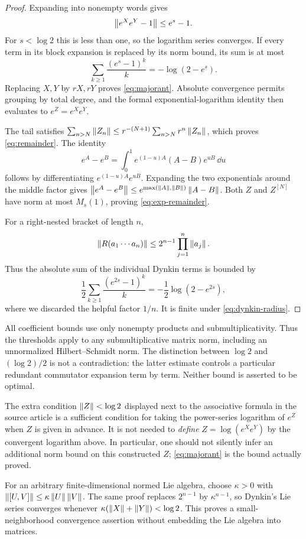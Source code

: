\begin{proof}
Expanding into nonempty words gives
\[
 \left\lVert e^Xe^Y-1\right\rVert\leq e^s-1.
\]
For $s<\log2$ this is less than one, so the logarithm series converges. If every term in its block expansion is replaced by its norm bound, its sum is at most
\[
 \sum_{k\geq1}\frac{(e^s-1)^k}{k}=-\log(2-e^s).
\]
Replacing $X,Y$ by $rX,rY$ proves \cref{eq:majorant}. Absolute convergence permits grouping by total degree, and the formal exponential-logarithm identity then evaluates to $e^Z=e^Xe^Y$.

The tail satisfies
$\sum_{n>N}\left\lVert Z_n\right\rVert\leq r^{-(N+1)}\sum_{n>N}r^n\left\lVert Z_n\right\rVert$,
which proves \cref{eq:remainder}. The identity
\[
 e^A-e^B=\int_0^1e^{(1-u)A}(A-B)e^{uB}\,\dd u
\]
follows by differentiating $e^{(1-u)A}e^{uB}$. Expanding the two exponentials around the middle factor gives
$\left\lVert e^A-e^B\right\rVert\leq e^{\max(\left\lVert A\right\rVert,\left\lVert B\right\rVert)}\left\lVert A-B\right\rVert$.
Both $Z$ and $Z^{[N]}$ have norm at most $M_s(1)$, proving \cref{eq:exp-remainder}.

For a right-nested bracket of length $n$,
\[
 \left\lVert R(a_1\cdots a_n)\right\rVert\leq2^{n-1}\prod_{j=1}^n\left\lVert a_j\right\rVert.
\]
Thus the absolute sum of the individual Dynkin terms is bounded by
\[
 \frac12\sum_{k\geq1}\frac{(e^{2s}-1)^k}{k}
 =-\frac12\log(2-e^{2s}),
\]
where we discarded the helpful factor $1/n$. It is finite under \cref{eq:dynkin-radius}.
\end{proof}
All coefficient bounds use only nonempty products and submultiplicativity. Thus the thresholds apply to any submultiplicative matrix norm, including an unnormalized Hilbert--Schmidt norm. The distinction between $\log2$ and $(\log2)/2$ is not a contradiction: the latter estimate controls a particular redundant commutator expansion term by term. Neither bound is asserted to be optimal.

The extra condition $\left\lVert Z\right\rVert<\log2$ displayed next to the associative formula in the source article is a sufficient condition for taking the power-series logarithm of $e^Z$ when $Z$ is given in advance. It is not needed to \emph{define} $Z=\log(e^Xe^Y)$ by the convergent logarithm above. In particular, one should not silently infer an additional norm bound on this constructed $Z$; \cref{eq:majorant} is the bound actually proved.

For an arbitrary finite-dimensional normed Lie algebra, choose $\kappa>0$ with
$\left\lVert [U,V]\right\rVert\leq\kappa\left\lVert U\right\rVert\left\lVert V\right\rVert$. The same proof replaces $2^{n-1}$ by $\kappa^{n-1}$, so Dynkin's Lie series converges whenever
$\kappa(\left\lVert X\right\rVert+\left\lVert Y\right\rVert)<\log2$. This proves a small-neighborhood convergence assertion without embedding the Lie algebra into matrices.

